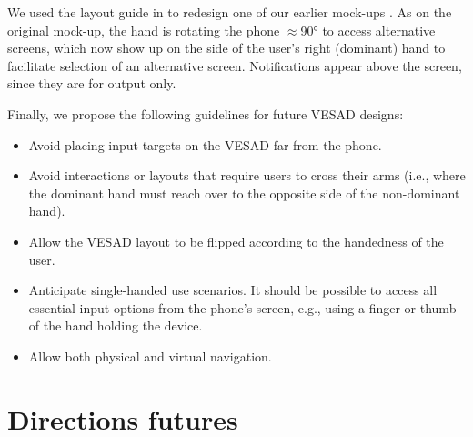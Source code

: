 
We used the layout guide in  to redesign one of our earlier mock-ups . As on the original mock-up, the hand is rotating the phone $\approx$\ang{90} to access alternative screens, which now show up on the side of the user's right (dominant) hand to facilitate selection of an alternative screen. Notifications appear above the screen, since they are for output only.

Finally, we propose the following guidelines for future VESAD designs:

\begin{itemize}
  \item Avoid placing input targets on the VESAD far from the phone.
  \item Avoid interactions or layouts that require users to cross their arms (i.e., where the dominant hand must reach over to the opposite side of the non-dominant hand).
  \item Allow the VESAD layout to be flipped according to the handedness of the user.
  \item Anticipate single-handed use scenarios. It should be possible to access all essential input options from the phone's screen, e.g., using a finger or thumb of the hand holding the device.
  \item Allow both physical and virtual navigation.
\end{itemize}



\section{Directions futures}
\label{sec:future_work}

